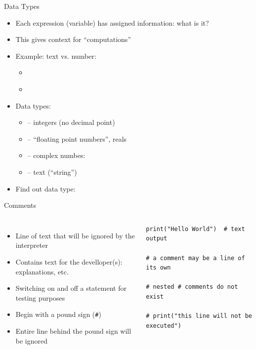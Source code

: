 \begin{frame}{Data Types}
%
\begin{itemize}
\item Each expression (\zB variable) has assigned information: what is it?
\item This gives context for \enquote{computations}
\item Example: text vs. number:
	\begin{itemize}
	\item {} \thus~ 
	\item {} \thus~ 
	\end{itemize}
\item Data types:
	\begin{itemize}
	\item {} -- integers (no decimal point)
	\item {} -- \enquote{floating point numbers}, reals
	\item {} -- complex numbes: 
	\item {} -- text (\enquote{string})
	\end{itemize}
\item Find out data type: 
\end{itemize}
%
\end{frame}


\begin{frame}[fragile]{Comments}
%
\begin{columns}[T]
\begin{itemize}
\item Line of text that will be ignored by the interpreter
\item Contains text for the develloper(s): explanations, etc.
\item Switching on and off a statement for testing purposes
\item Begin with a pound sign (\texttt{\#})
\item Entire line behind the pound sign will be ignored
\end{itemize}
%
\begin{codebox}
\begin{verbatim}
print("Hello World")  # text output

# a comment may be a line of its own

# nested # comments do not exist

# print("this line will not be executed")
\end{verbatim}
\end{codebox}
\end{columns}
%
\end{frame}
